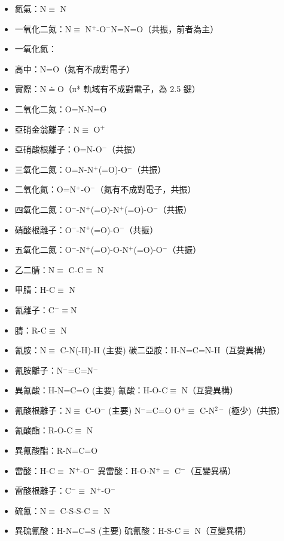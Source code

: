 \documentclass[a4paper,12pt]{report}
\begin{document}
\begin{itemize}
\item 氮氣：N$\equiv$ N
\item 一氧化二氮：N$\equiv$ N$^+$-O$^-$\ce{<=>}N=N=O（共振，前者為主）
\item 一氧化氮：
\bit
\item 高中：N=O（氮有不成對電子）
\item 實際：N$\doteq$O（π* 軌域有不成對電子，為 2.5 鍵）
\eit
\item 二氧化二氮：O=N-N=O
\item 亞硝金翁離子：N$\equiv$ O$^+$
\item 亞硝酸根離子：O=N-O$^-$（共振）
\item 三氧化二氮：O=N-N$^+$(=O)-O$^-$（共振）
\item 二氧化氮：O=N$^+$-O$^-$（氮有不成對電子，共振）
\item 四氧化二氮：O$^-$-N$^+$(=O)-N$^+$(=O)-O$^-$（共振）
\item 硝酸根離子：O$^-$-N$^+$(=O)-O$^-$（共振）
\item 五氧化二氮：O$^-$-N$^+$(=O)-O-N$^+$(=O)-O$^-$（共振）
\item 乙二腈：N$\equiv$ C-C$\equiv$ N
\item 甲腈：H-C$\equiv$ N
\item 氰離子：C$^-\equiv$N
\item 腈：R-C$\equiv$ N
\item 氰胺：N$\equiv$ C-N(-H)-H (主要) \ce{<=>} 碳二亞胺：H-N=C=N-H（互變異構）
\item 氰胺離子：N$^-$=C=N$^-$
\item 異氰酸：H-N=C=O (主要) \ce{<=>} 氰酸：H-O-C$\equiv$ N（互變異構）
\item 氰酸根離子：N$\equiv$ C-O$^-$ (主要) \ce{<=>} N$^-$=C=O \ce{<=>} O$^+\equiv$ C-N$^{2-}$ (極少)（共振）
\item 氰酸酯：R-O-C$\equiv$ N
\item 異氰酸酯：R-N=C=O
\item 雷酸：H-C$\equiv$ N$^+$-O$^-$ \ce{<=>} 異雷酸：H-O-N$^+\equiv$ C$^-$（互變異構）
\item 雷酸根離子：C$^-\equiv$ N$^+$-O$^-$
\item 硫氰：N$\equiv$ C-S-S-C$\equiv$ N
\item 異硫氰酸：H-N=C=S (主要) \ce{<=>} 硫氰酸：H-S-C$\equiv$ N（互變異構）

\end{itemize}
\end{document}
